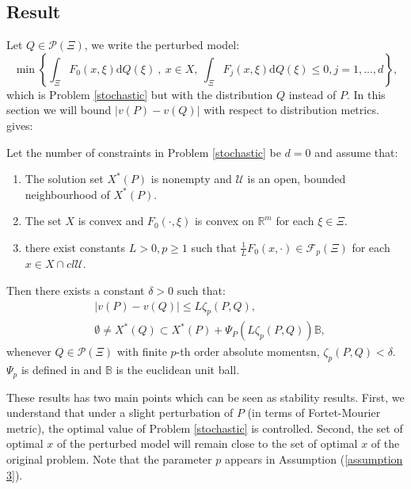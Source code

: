 \documentclass{amsart}
\newcommand{\RR}{\mathbb{R}}
\begin{document}
\subsection{Result}
Let $Q\in\mathcal{P}\left(\Xi\right)$, we write the perturbed model:
\begin{equation*}
    \min\left\{\int_\Xi F_0\left(x,\xi\right)\text{d}Q\left(\xi\right)\:,\: x\in X, \: \int_\Xi F_j\left(x,\xi\right)\text{d}Q\left(\xi\right)\leq0, j=1,...,d\right\},
\end{equation*}
which is Problem \eqref{stochastic} but with the distribution $Q$ instead of $P$. In this section we will bound $\lvert v\left(P\right)-v\left(Q\right)\rvert$ with respect to distribution metrics. \cite[Corollary 14]{romisch_stability_2003} gives:
\begin{theorem}\label{stability_th}
    Let the number of constraints in Problem \eqref{stochastic} be $d=0$ and assume that:
    \begin{enumerate}
        \item The  solution set $X^*\left(P\right)$ is nonempty and $\mathcal{U}$ is an open, bounded neighbourhood of $X^*\left(P\right)$.
        \item The set $X$ is convex and $F_0\left(\cdot,\xi\right)$ is convex on $\RR^m$ for each $\xi\in\Xi$.
        \item there exist constants $L>0, p\geq1$ such that $\frac{1}{L}F_0\left(x,\cdot \right)\in\mathcal{F}_p\left(\Xi\right)$ for each $x\in X\cap cl\mathcal{U}$. \label{assumption 3}
    \end{enumerate}
    Then there exists a constant $\delta>0$ such that:
    \begin{align*}
        &\lvert v\left(P\right)-v\left(Q\right)\rvert \leq L\zeta_p\left(P,Q\right), \\
        & \emptyset \ne X^*\left(Q\right)\subset X^*\left(P\right)+\Psi_P\left(L\zeta_p\left(P,Q\right)\right)\mathbb{B},
    \end{align*}
     whenever $Q\in\mathcal{P}\left(\Xi\right)$ with finite $p$-th order absolute momentsn, $\zeta_p\left(P,Q\right)<\delta$. $\Psi_p$ is defined in \cite[2.22-2.23]{romisch_stability_2003} and $\mathbb{B}$ is the euclidean unit ball.
\end{theorem}
These results has two main points which can be seen as stability results. First, we understand that under a slight perturbation of $P$ (in terms of Fortet-Mourier metric), the optimal value of Problem \eqref{stochastic} is controlled. Second, the set of optimal $x$ of the perturbed model will remain close to the set of optimal $x$ of the original problem. Note that the parameter $p$ appears in Assumption (\ref{assumption 3}).
\end{document}
